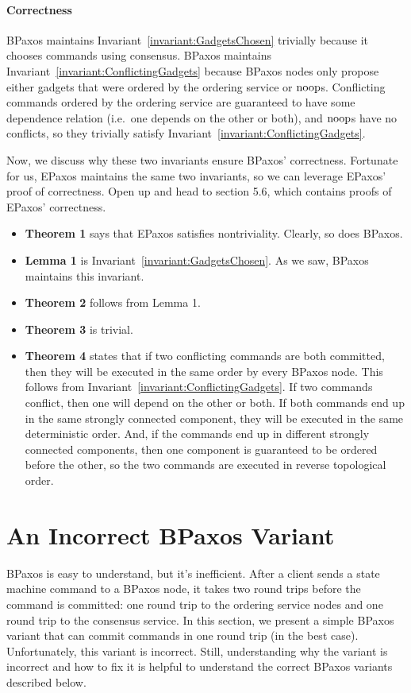 \documentclass{mwhittaker}
\theoremstyle{definition}
\newcommand{\invref}[1]{Invariant~\ref{invariant:#1}}
\begin{document}
\paragraph{Correctness}
BPaxos maintains \invref{GadgetsChosen} trivially because it chooses commands
using consensus. BPaxos maintains \invref{ConflictingGadgets} because BPaxos
nodes only propose either gadgets that were ordered by the ordering service or
$\text{noop}$s. Conflicting commands ordered by the ordering service are guaranteed
to have some dependence relation (i.e.\ one depends on the other or both), and
$\text{noop}$s have no conflicts, so they trivially satisfy
\invref{ConflictingGadgets}.

Now, we discuss why these two invariants ensure BPaxos' correctness. Fortunate
for us, EPaxos maintains the same two invariants, so we can leverage EPaxos'
proof of correctness. Open up \cite{moraru2013proof} and head to section 5.6,
which contains proofs of EPaxos' correctness.
\begin{itemize}
  \item
    \textbf{Theorem 1} says that EPaxos satisfies nontriviality. Clearly, so
    does BPaxos.

  \item
    \textbf{Lemma 1} is \invref{GadgetsChosen}. As we saw, BPaxos maintains
    this invariant.

  \item
    \textbf{Theorem 2} follows from Lemma 1.

  \item
    \textbf{Theorem 3} is trivial.

  \item
    \textbf{Theorem 4} states that if two conflicting commands are both
    committed, then they will be executed in the same order by every BPaxos
    node. This follows from \invref{ConflictingGadgets}. If two commands
    conflict, then one will depend on the other or both. If both commands end
    up in the same strongly connected component, they will be executed in the
    same deterministic order. And, if the commands end up in different strongly
    connected components, then one component is guaranteed to be ordered before
    the other, so the two commands are executed in reverse topological order.
\end{itemize}

\section{An Incorrect BPaxos Variant}
BPaxos is easy to understand, but it's inefficient. After a client sends a
state machine command to a BPaxos node, it takes two round trips before the
command is committed: one round trip to the ordering service nodes and one
round trip to the consensus service. In this section, we present a simple
BPaxos variant that can commit commands in one round trip (in the best case).
Unfortunately, this variant is incorrect. Still, understanding why the variant
is incorrect and how to fix it is helpful to understand the correct BPaxos
variants described below.
\end{document}
